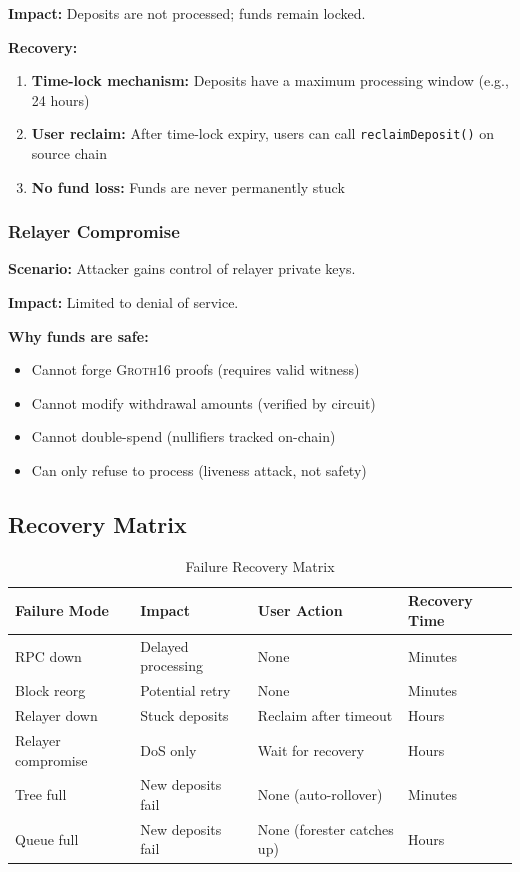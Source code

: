 \documentclass[11pt,a4paper,twoside]{article}
\newcommand{\groth}{\textsc{Groth16}}
\begin{document}
\textbf{Impact:} Deposits are not processed; funds remain locked.

\textbf{Recovery:}
\begin{enumerate}
    \item \textbf{Time-lock mechanism:} Deposits have a maximum processing window (e.g., 24 hours)
    \item \textbf{User reclaim:} After time-lock expiry, users can call \texttt{reclaimDeposit()} on source chain
    \item \textbf{No fund loss:} Funds are never permanently stuck
\end{enumerate}

\subsubsection{Relayer Compromise}
\textbf{Scenario:} Attacker gains control of relayer private keys.

\textbf{Impact:} Limited to denial of service.

\textbf{Why funds are safe:}
\begin{itemize}
    \item Cannot forge \groth{} proofs (requires valid witness)
    \item Cannot modify withdrawal amounts (verified by circuit)
    \item Cannot double-spend (nullifiers tracked on-chain)
    \item Can only refuse to process (liveness attack, not safety)
\end{itemize}

\subsection{Recovery Matrix}

\begin{table}[H]
\centering
\caption{Failure Recovery Matrix}
\label{tab:recovery}
\begin{tabular}{@{}llll@{}}
\toprule
\textbf{Failure Mode} & \textbf{Impact} & \textbf{User Action} & \textbf{Recovery Time} \\
\midrule
RPC down & Delayed processing & None & Minutes \\
Block reorg & Potential retry & None & Minutes \\
Relayer down & Stuck deposits & Reclaim after timeout & Hours \\
Relayer compromise & DoS only & Wait for recovery & Hours \\
Tree full & New deposits fail & None (auto-rollover) & Minutes \\
Queue full & New deposits fail & None (forester catches up) & Hours \\
\bottomrule
\end{tabular}
\end{table}
\end{document}

